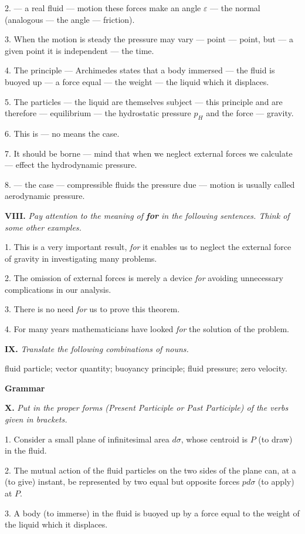 \documentclass[a4paper]{article}
\newcommand{\ESect}[1]{\medskip\par{\large \textbf{#1}}\par}
\newcommand{\ETask}[2]{\medskip\par\textbf{#1.} \textit{#2}\par}
\begin{document}
2. --- a real fluid --- motion these forces make an angle $\varepsilon$ --- the normal (analogous --- the angle --- friction).

3. When the motion is steady the pressure may vary --- point --- point, but --- a given point it is independent --- the time.

4. The principle --- Archimedes states that a body immersed --- the fluid is buoyed up --- a force equal --- the weight --- the
liquid which it displaces.

5. The particles --- the liquid are themselves subject --- this principle and are therefore --- equilibrium --- the
hydrostatic pressure $p_H$ and the force --- gravity.

6. This is --- no means the case.

7. It should be borne --- mind that when we neglect external forces we calculate --- effect the hydrodynamic pressure.

8. --- the case --- compressible fluids the pressure due --- motion is usually called aerodynamic pressure.

\ETask{VIII}{Pay attention to the meaning of \textbf{for} in the following sentences. Think of some other examples.}
1. This is a very important result, \textit{for} it enables us to neglect the external force of gravity in investigating many problems.

2. The omission of external forces is merely a device \textit{for} avoiding unnecessary complications in our analysis.

3. There is no need \textit{for} us to prove this theorem.

4. For many years mathematicians have looked \textit{for} the solution of the problem.

\ETask{IX}{Translate the following combinations of nouns.}
fluid particle; vector quantity; buoyancy principle; fluid pressure; zero velocity.

\ESect{Grammar}
\ETask{X}{Put in the proper forms (Present Participle or Past Participle) of the verbs given in brackets.}

1. Consider a small plane of infinitesimal area $d \sigma$, whose centroid is $P$ (to draw) in the fluid.

2. The mutual action of the fluid particles on the two sides of the plane can, at a (to give) instant, be represented by
two equal but opposite forces $p d \sigma$ (to apply) at $P$.

3. A body (to immerse) in the fluid is buoyed up by a force equal to the weight of the liquid which it displaces.
\end{document}
